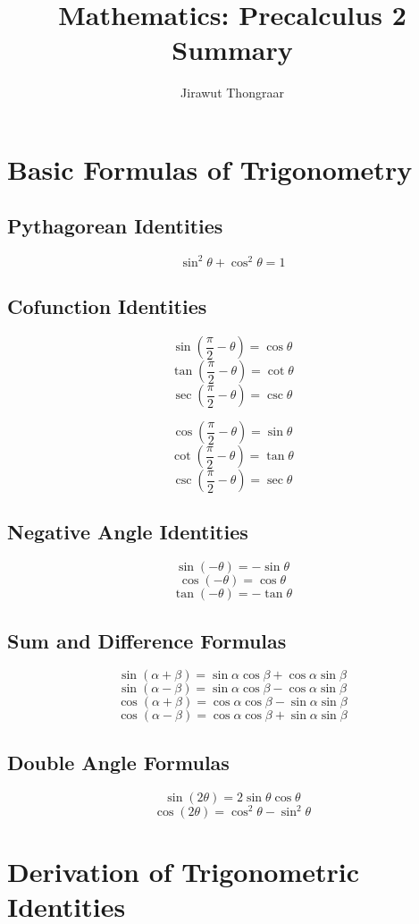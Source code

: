\documentclass[a4paper,12pt]{article}
\title{Mathematics: Precalculus 2 Summary}
\author{Jirawut Thongraar}
\begin{document}
\maketitle

\section{Basic Formulas of Trigonometry}

\subsection{Pythagorean Identities}
$$\sin^2\theta+\cos^2\theta=1$$

\subsection{Cofunction Identities}
\begin{multicols}{2}
	$$\sin(\frac{\pi}{2}-\theta)=\cos\theta$$
	$$\tan(\frac{\pi}{2}-\theta)=\cot\theta$$
	$$\sec(\frac{\pi}{2}-\theta)=\csc\theta$$
	
	$$\cos(\frac{\pi}{2}-\theta)=\sin\theta$$
	$$\cot(\frac{\pi}{2}-\theta)=\tan\theta$$
	$$\csc(\frac{\pi}{2}-\theta)=\sec\theta$$
\end{multicols}

\subsection{Negative Angle Identities}
$$\sin(-\theta)=-\sin\theta$$
$$\cos(-\theta)=\cos\theta$$
$$\tan(-\theta)=-\tan\theta$$

\subsection{Sum and Difference Formulas}
$$\sin(\alpha+\beta)=\sin\alpha\cos\beta+\cos\alpha\sin\beta$$
$$\sin(\alpha-\beta)=\sin\alpha\cos\beta-\cos\alpha\sin\beta$$
$$\cos(\alpha+\beta)=\cos\alpha\cos\beta-\sin\alpha\sin\beta$$
$$\cos(\alpha-\beta)=\cos\alpha\cos\beta+\sin\alpha\sin\beta$$

\subsection{Double Angle Formulas}
$$\sin(2\theta)=2\sin\theta\cos\theta$$
$$\cos(2\theta)=\cos^2\theta-\sin^2\theta$$

\section{Derivation of Trigonometric Identities}
\end{document}
